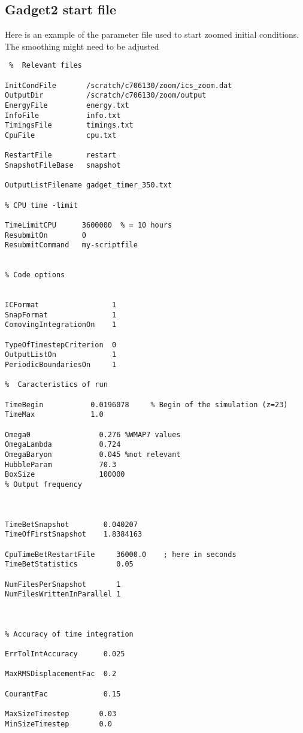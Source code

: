 \documentclass[a4paper,english,10.5pt]{scrartcl}
\begin{document}
\subsection{Gadget2 start file}
Here is an example of the parameter file used to start zoomed initial conditions. The smoothing might need to be adjusted
\begin{verbatim}
 %  Relevant files

InitCondFile  	   /scratch/c706130/zoom/ics_zoom.dat
OutputDir          /scratch/c706130/zoom/output
EnergyFile         energy.txt
InfoFile           info.txt
TimingsFile        timings.txt
CpuFile            cpu.txt

RestartFile        restart
SnapshotFileBase   snapshot

OutputListFilename gadget_timer_350.txt

% CPU time -limit

TimeLimitCPU      3600000  % = 10 hours
ResubmitOn        0
ResubmitCommand   my-scriptfile  


% Code options


ICFormat                 1
SnapFormat               1
ComovingIntegrationOn    1

TypeOfTimestepCriterion  0
OutputListOn             1
PeriodicBoundariesOn     1

%  Caracteristics of run

TimeBegin           0.0196078     % Begin of the simulation (z=23)
TimeMax	            1.0

Omega0	              0.276 %WMAP7 values
OmegaLambda           0.724
OmegaBaryon           0.045 %not relevant
HubbleParam           70.3
BoxSize               100000
% Output frequency



TimeBetSnapshot        0.040207
TimeOfFirstSnapshot    1.8384163

CpuTimeBetRestartFile     36000.0    ; here in seconds
TimeBetStatistics         0.05

NumFilesPerSnapshot       1
NumFilesWrittenInParallel 1



% Accuracy of time integration

ErrTolIntAccuracy      0.025 

MaxRMSDisplacementFac  0.2

CourantFac             0.15     

MaxSizeTimestep       0.03
MinSizeTimestep       0.0





\end{verbatim}
\end{document}
